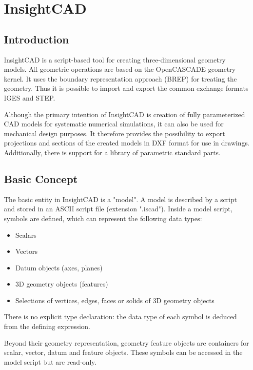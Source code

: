 \section{InsightCAD}

\subsection{Introduction}

InsightCAD is a script-based tool for creating three-dimensional geometry models. 
All geometric operations are based on the OpenCASCADE geometry kernel. 
It uses the boundary representation approach (BREP) for treating the geometry. Thus it is possible to import and export the common exchange formats IGES and STEP.

Although the primary intention of InsightCAD is creation of
fully parameterized CAD models for systematic numerical simulations, it
can also be used for mechanical design purposes. 
It therefore provides the possibility to export projections and sections of the created models in DXF format for use in drawings. 
Additionally, there is support for a library of parametric standard parts.

\subsection{Basic Concept}

The basic entity in InsightCAD is a "model". A model is
described by a script and stored in an ASCII script file (extension
".iscad"). Inside a model script, symbols are defined, which can
represent the following data types:

\begin{itemize}
\item Scalars
\item Vectors
\item Datum objects (axes, planes)
\item 3D geometry objects (features)
\item Selections of vertices, edges, faces or solids of 3D geometry objects
\end{itemize}

There is no explicit type declaration: the data type of each symbol is
deduced from the defining expression.

Beyond their geometry representation, geometry feature objects are containers for scalar, vector, datum and feature objects. 
These symbols can be accessed in the model script but are read-only.


